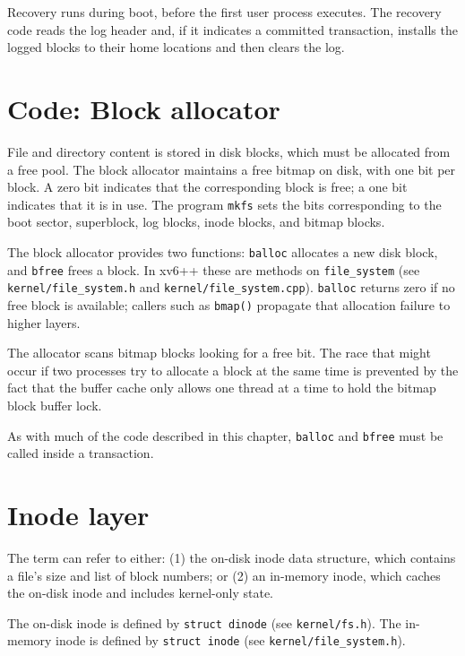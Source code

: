 Recovery runs during boot, before the first user process executes. The recovery code
reads the log header and, if it indicates a committed transaction, installs the logged
blocks to their home locations and then clears the log.

\section{Code: Block allocator}

File and directory content is stored in disk blocks, which must be allocated from a free pool.
The block allocator maintains a free bitmap on disk, with one bit per block.
A zero bit indicates that the corresponding block is free; a one bit indicates that it is in use.
The program \lstinline{mkfs} sets the bits corresponding to the boot sector, superblock, log blocks,
inode blocks, and bitmap blocks.

The block allocator provides two functions:
\lstinline{balloc} allocates a new disk block, and \lstinline{bfree} frees a block.
In xv6++ these are methods on \lstinline{file_system}
(see \texttt{kernel/file\_system.h} and \texttt{kernel/file\_system.cpp}).
\lstinline{balloc} returns zero if no free block is available; callers such as
\lstinline{bmap()} propagate that allocation failure to higher layers.

The allocator scans bitmap blocks looking for a free bit. The race that might occur if two
processes try to allocate a block at the same time is prevented by the fact that the buffer
cache only allows one thread at a time to hold the bitmap block buffer lock.

As with much of the code described in this chapter, \lstinline{balloc} and \lstinline{bfree}
must be called inside a transaction.

\section{Inode layer}

The term  can refer to either:
(1) the on-disk inode data structure, which contains a file’s size and list of block numbers; or
(2) an in-memory inode, which caches the on-disk inode and includes kernel-only state.

The on-disk inode is defined by \lstinline{struct dinode} (see \texttt{kernel/fs.h}).
The in-memory inode is defined by \lstinline{struct inode} (see \texttt{kernel/file\_system.h}).

